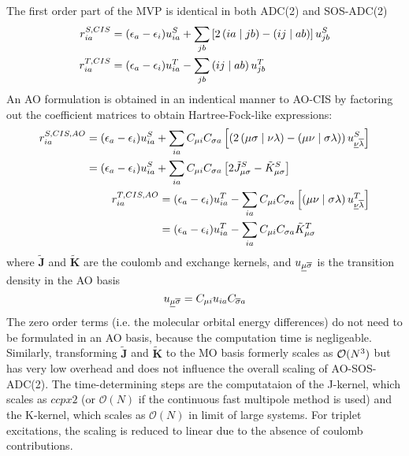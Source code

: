 The first order part of the MVP is identical in both ADC(2) and SOS-ADC(2)
\begin{align}
r_{ia}^{S,CIS} &= (\epsilon_a - \epsilon_i) u^S_{ia} + \sum_{jb} \left[ 2\left( ia \mid jb \right) - \left( ij \mid ab \right)\right] u^S_{jb} \\
r_{ia}^{T,CIS} &= (\epsilon_a - \epsilon_i) u^T_{ia} - \sum_{jb} \left( ij \mid ab \right) u^T_{jb} 
\end{align}
\noindent An AO formulation is obtained in an indentical manner to AO-CIS by factoring out the coefficient matrices to obtain Hartree-Fock-like expressions:
\begin{align}
\begin{split}
r_{ia}^{S,CIS,AO} &= (\epsilon_a - \epsilon_i) u^S_{ia} + \sum_{ia} C_{\mu i} C_{\sigma a} \left[ \left( 2\left( \mu\sigma \mid \nu\lambda \right) - \left( \mu\nu \mid \sigma\lambda \right) \right) u^S_{\underline{\nu} \overline{\lambda}} \right] \\
&= (\epsilon_a - \epsilon_i) u^S_{ia} + \sum_{ia} C_{\mu i} C_{\sigma a} \left[ 2\tilde{J}^S_{\mu\sigma} - \tilde{K}^S_{\mu\sigma} \right]
\end{split}
\\
\begin{split}
r_{ia}^{T,CIS,AO} &= (\epsilon_a - \epsilon_i) u^T_{ia} - \sum_{ia} C_{\mu i} C_{\sigma a} \left[ \left( \mu\nu \mid \sigma\lambda \right) u^T_{\underline{\nu} \overline{\lambda}} \right] \\
&= (\epsilon_a - \epsilon_i) u^T_{ia} - \sum_{ia} C_{\mu i} C_{\sigma a} \tilde{K}^T_{\mu\sigma} 
\end{split}
\end{align}
\noindent where $\mathbf{\tilde{J}}$ and $\mathbf{\tilde{K}}$ are the coulomb and exchange kernels, and $u_{\underline{\mu}\overline{\sigma}}$ is the transition density in the AO basis
\begin{equation}
u_{\underline{\mu}\overline{\sigma}} = C_{\mu i} u_{ia} C_{\overline{\sigma} a}
\end{equation}
\noindent The zero order terms (i.e. the molecular orbital energy differences) do not need to be formulated in an AO basis, because the computation time is negligeable. Similarly, transforming $\mathbf{\tilde{J}}$ and $\mathbf{\tilde{K}}$ to the MO basis formerly scales as $\mathcal{O}(N^{3})$ but has very low overhead and does not influence the overall scaling of AO-SOS-ADC(2). The time-determining steps are the computataion of the J-kernel, which scales as $ccpx{2}$ (or $\mathcal{O}(N)$ if the continuous fast multipole method is used) and the K-kernel, which scales as $\mathcal{O}(N)$ in limit of large systems. For triplet excitations, the scaling is reduced to linear due to the absence of coulomb contributions.

